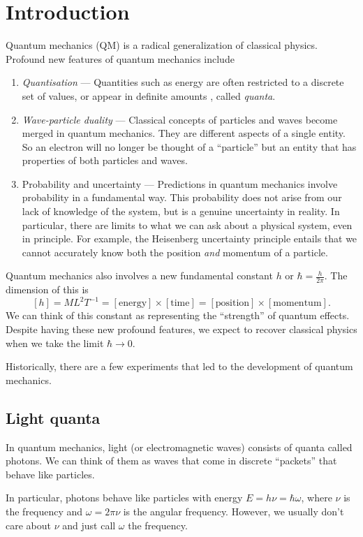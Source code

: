 \documentclass[a4paper]{article}
\begin{document}
\section{Introduction}
Quantum mechanics (QM) is a radical generalization of classical physics. Profound new features of quantum mechanics include
\begin{enumerate}
  \item \emph{Quantisation} --- Quantities such as energy are often restricted to a discrete set of values, or appear in definite amounts , called \emph{quanta}.
  \item \emph{Wave-particle duality} --- Classical concepts of particles and waves become merged in quantum mechanics. They are different aspects of a single entity. So an electron will no longer be thought of a ``particle'' but an entity that has properties of both particles and waves.
  \item Probability and uncertainty --- Predictions in quantum mechanics involve probability in a fundamental way. This probability does not arise from our lack of knowledge of the system, but is a genuine uncertainty in reality. In particular, there are limits to what we can ask about a physical system, even in principle. For example, the Heisenberg uncertainty principle entails that we cannot accurately know both the position \emph{and} momentum of a particle.
\end{enumerate}
Quantum mechanics also involves a new fundamental constant $h$ or $\hbar = \frac{h}{2\pi}$. The dimension of this is
\[
  [h] = ML^2T^{-1} = [\text{energy}]\times [\text{time}] = [\text{position}] \times [\text{momentum}].
\]
We can think of this constant as representing the ``strength'' of quantum effects. Despite having these new profound features, we expect to recover classical physics when we take the limit $\hbar \to 0$.

Historically, there are a few experiments that led to the development of quantum mechanics.
\subsection{Light quanta}
In quantum mechanics, light (or electromagnetic waves) consists of quanta called photons. We can think of them as waves that come in discrete ``packets'' that behave like particles.

In particular, photons behave like particles with energy $E = h \nu = \hbar \omega$, where $\nu$ is the frequency and $\omega = 2\pi \nu$ is the angular frequency. However, we usually don't care about $\nu$ and just call $\omega$ the frequency.
\end{document}
